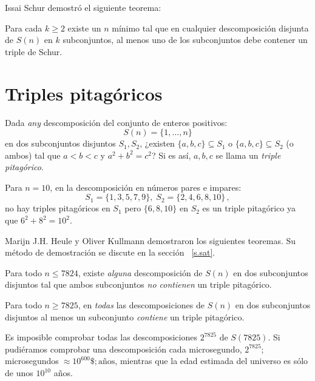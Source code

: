 Issai Schur demostró el siguiente teorema:
\begin{theorem}[Schur]
Para cada $k\geq 2$ existe un $n$ mínimo tal que en cualquier descomposición disjunta de $S(n)$ en $k$ subconjuntos, al menos uno de los subconjuntos debe contener un triple de Schur.
\end{theorem}


\section{Triples pitagóricos}\label{s.pyth}

\begin{definition}
Dada \emph{any} descomposición del conjunto de enteros positivos:
\[
S(n)=\{1,\ldots,n\}
\]
en dos subconjuntos disjuntos $S_1,S_2$, ¿existen $\{a,b,c\}\subseteq S_1$ o $\{a,b,c\}\subseteq S_2$ (o ambos) tal que $a\!<\!b\!<\!c$ y $a^2+b^2=c^2$? Si es así, $ {a,b,c}$ se llama un \emph{triple pitagórico}.
\end{definition}

\begin{example}
Para $n=10$, en la descomposición en números pares e impares:
\[
S_1 = \{1,3,5,7,9\},\; S_2=\{2,4,6,8,10\}\,,
\]
no hay triples pitagóricos en $S_1$ pero $\{6,8,10\}$ en $S_2$ es un triple pitagórico ya que $6^2+8^2=10^2$.
\end{example}

Marijn J.H. Heule y Oliver Kullmann demostraron los siguientes teoremas. Su método de demostración se discute en la sección ~\ref{s.sat}.

\begin{theorem}
Para todo $n\leq 7824$, existe \emph{alguna} descomposición de $S(n)$ en dos subconjuntos disjuntos tal que ambos subconjuntos \emph{no contienen} un triple pitagórico.
\end{theorem}

\begin{theorem}
Para todo $n\geq 7825$, en \emph{todas} las descomposiciones de $S(n)$ en dos subconjuntos disjuntos al menos un subconjunto \emph{contiene} un triple pitagórico.
\end{theorem}
Es imposible comprobar todas las descomposiciones $2^{7825}$ de $S(7825)$. Si pudiéramos comprobar una descomposición cada microsegundo, $2^{7825}$; \textrm{microsegundos}$\;\approx 10^{600}\$; \textrm{años}$, mientras que la edad estimada del universo es sólo de unos $10^{10}$ años.

